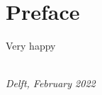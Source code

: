 \chapter*{Preface}

Very happy

\begin{flushright}
{\makeatletter\itshape
    \@author \\
    Delft, February 2022
\makeatother}
\end{flushright}


